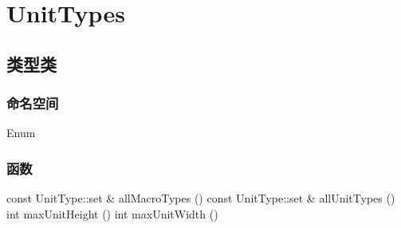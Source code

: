 \tableofcontents
\section{UnitTypes}
\subsection{类型类}
\subsubsection{命名空间}
Enum
\subsubsection{函数}
\begin{codebox}[函数]
const UnitType::set & allMacroTypes ()
const UnitType::set & allUnitTypes ()
int maxUnitHeight ()
int maxUnitWidth ()
\end{codebox}
